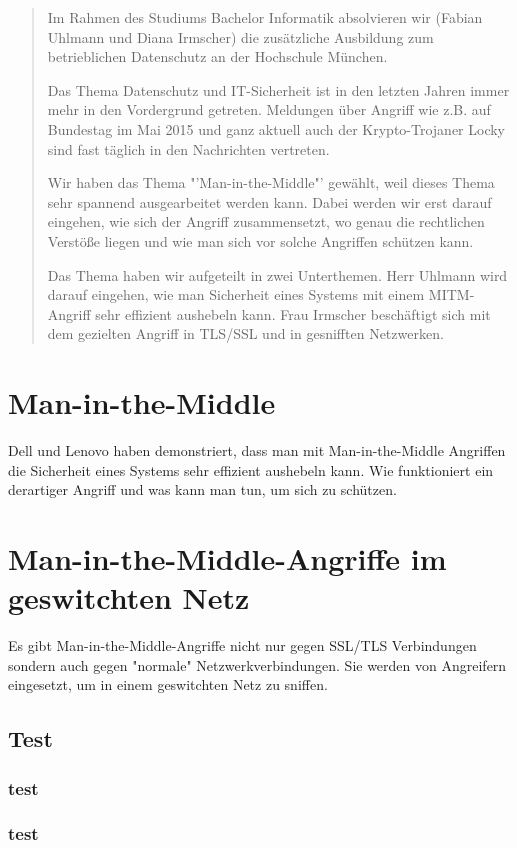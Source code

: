 \documentclass[10pt, a4paper]{scrreprt}
\begin{document}
	\begin{abstract}
		Im Rahmen des Studiums Bachelor Informatik absolvieren wir (Fabian Uhlmann und Diana Irmscher) die zusätzliche Ausbildung zum betrieblichen Datenschutz an der Hochschule München.
		
		Das Thema Datenschutz und IT-Sicherheit ist in den letzten Jahren immer mehr in den Vordergrund getreten. Meldungen über Angriff wie z.B. auf Bundestag im Mai 2015 und ganz aktuell auch der Krypto-Trojaner Locky sind fast täglich in den Nachrichten vertreten.
		
		Wir haben das Thema "'Man-in-the-Middle"' gewählt, weil dieses Thema sehr spannend ausgearbeitet werden kann.
		Dabei werden wir erst darauf eingehen, wie sich der Angriff zusammensetzt, wo genau die rechtlichen Verstöße liegen und wie man sich vor solche Angriffen schützen kann.
		
		Das Thema haben wir aufgeteilt in zwei Unterthemen.
		Herr Uhlmann wird darauf eingehen, wie man Sicherheit eines Systems mit einem MITM-Angriff sehr effizient aushebeln kann.
		Frau Irmscher beschäftigt sich mit dem gezielten Angriff in TLS/SSL und in gesnifften Netzwerken.
		 
	\end{abstract}
	
	\chapter{Man-in-the-Middle}
	Dell und Lenovo haben demonstriert, dass man mit Man-in-the-Middle
	Angriffen die Sicherheit eines Systems sehr effizient aushebeln kann.
	Wie funktioniert ein derartiger Angriff und was kann man tun, um sich
	zu schützen.
	\section{}
	\subsection{} 
	\subsection{} 
	
	\chapter{Man-in-the-Middle-Angriffe im geswitchten Netz}
	Es gibt Man-in-the-Middle-Angriffe nicht nur gegen SSL/TLS
	Verbindungen sondern auch gegen "normale" Netzwerkverbindungen.
	Sie werden von Angreifern eingesetzt, um in einem geswitchten Netz
	zu sniffen.
	\section{Test}
	\subsection{test} 
	\subsection{test} 

	\appendix
	
	
	
	
\end{document}
